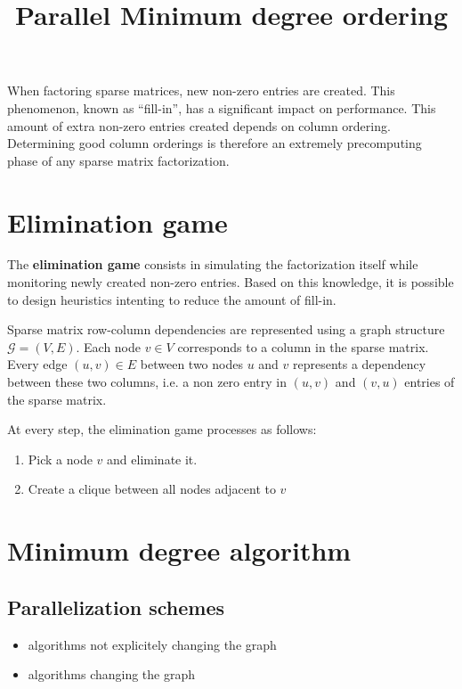 \documentclass[a4paper]{article}
\title{Parallel Minimum degree ordering}
\date{}
\begin{document}
\maketitle


When factoring sparse matrices, new non-zero entries are created. This phenomenon,
known as ``fill-in'', has a significant impact on performance. This amount
of extra non-zero entries created depends on column ordering. Determining good
column orderings is therefore an extremely precomputing phase of any sparse matrix
factorization.

\section{Elimination game}

The \textbf{elimination game} consists in simulating the factorization itself while
monitoring newly created non-zero entries. Based on this knowledge, it is possible to
design heuristics intenting to reduce the amount of fill-in.

Sparse matrix row-column dependencies are represented using a graph structure $\mathcal{G} = (V,E)$.
Each node $v \in V$ corresponds to a column in the sparse matrix. Every edge $(u,v) \in E$ between two
nodes $u$ and $v$ represents a dependency between these two columns, i.e. a non zero entry in $(u,v)$
and $(v,u)$ entries of the sparse matrix. 

At every step, the elimination game processes as follows:
  \begin{enumerate}
    \item Pick a node $v$ and eliminate it.
    \item Create a clique between all nodes adjacent to $v$
  \end{enumerate}

\section{Minimum degree algorithm}

\subsection{Parallelization schemes}

\begin{itemize}
  \item algorithms not explicitely changing the graph
  \item algorithms changing the graph
\end{itemize}
\end{document}
